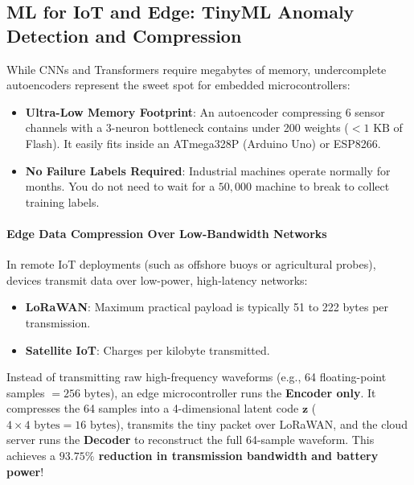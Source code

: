 \subsection{ML for IoT and Edge: TinyML Anomaly Detection and Compression}\label{subsec:iot_autoencoders}

\begin{iotbox}
While CNNs and Transformers require megabytes of memory, undercomplete autoencoders represent the sweet spot for embedded microcontrollers:
\begin{itemize}
    \item \textbf{Ultra-Low Memory Footprint}: An autoencoder compressing 6 sensor channels with a 3-neuron bottleneck contains under 200 weights ($<1\text{ KB}$ of Flash). It easily fits inside an ATmega328P (Arduino Uno) or ESP8266.
    \item \textbf{No Failure Labels Required}: Industrial machines operate normally for months. You do not need to wait for a $50{,}000$ machine to break to collect training labels.
\end{itemize}
\end{iotbox}

\paragraph{Edge Data Compression Over Low-Bandwidth Networks}
In remote IoT deployments (such as offshore buoys or agricultural probes), devices transmit data over low-power, high-latency networks:
\begin{itemize}
    \item \textbf{LoRaWAN}: Maximum practical payload is typically 51 to 222 bytes per transmission.
    \item \textbf{Satellite IoT}: Charges per kilobyte transmitted.
\end{itemize}
Instead of transmitting raw high-frequency waveforms (e.g., 64 floating-point samples $= 256\text{ bytes}$), an edge microcontroller runs the \textbf{Encoder only}. It compresses the 64 samples into a 4-dimensional latent code $\mathbf{z}$ ($4 \times 4 \text{ bytes} = 16\text{ bytes}$), transmits the tiny packet over LoRaWAN, and the cloud server runs the \textbf{Decoder} to reconstruct the full 64-sample waveform. This achieves a \textbf{$93.75\%$ reduction in transmission bandwidth and battery power}!

